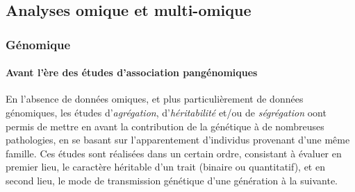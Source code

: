 \documentclass[11pt,a4paper,notrimn]{krantz}
\let\oldparagraph\paragraph
\renewcommand{\paragraph}[1]{\oldparagraph{#1}\mbox{}}
\theoremstyle{definition}
\theoremstyle{definition}
\theoremstyle{remark}
\begin{document}
\subsection{Analyses omique et
multi-omique}\label{analyses-omique-et-multi-omique}

\subsubsection{Génomique}\label{genomique-1}

\paragraph{Avant l'ère des études d'association
pangénomiques}\label{avant-lere-des-etudes-dassociation-pangenomiques}

En l'absence de données omiques, et plus particulièrement de données
génomiques, les études d'\emph{agrégation}, d'\emph{héritabilité} et/ou
de \emph{ségrégation} oont permis de mettre en avant la contribution de
la génétique à de nombreuses pathologies, en se basant sur
l'apparentement d'individus provenant d'une même famille. Ces études
sont réalisées dans un certain ordre, consistant à évaluer en premier
lieu, le caractère héritable d'un trait (binaire ou quantitatif), et en
second lieu, le mode de transmission génétique d'une génération à la
suivante.
\end{document}
